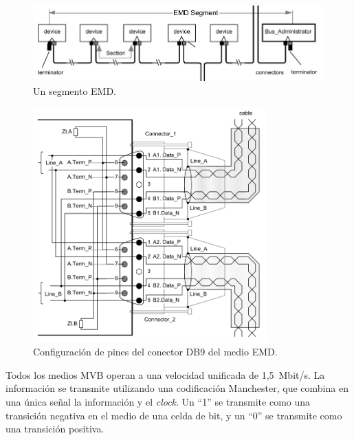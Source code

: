 \begin{figure}[htbp]
	\centering
	\includegraphics[width=1\textwidth]{./Figures/segmento.png}
	\caption[Un segmento EMD]{Un segmento EMD.
        \\ }
    \label{fig:segmento}
\end{figure}

\begin{figure}[htbp]
	\centering
	\includegraphics[width=0.8\textwidth]{./Figures/db9-emd.png}
	\caption[Configuración de pines del conector DB9 del medio EMD]{Configuración de pines del conector DB9 del medio EMD.
        \\ }
    \label{fig:db9}
\end{figure}

Todos los medios MVB operan a una velocidad unificada de 1,5~Mbit/s.
La información se transmite utilizando una codificación Manchester, que combina en una única señal la información y el \textit{clock}.
Un ``1'' se transmite como una transición negativa en el medio de una celda de bit, y un ``0'' se transmite como una transición positiva.


